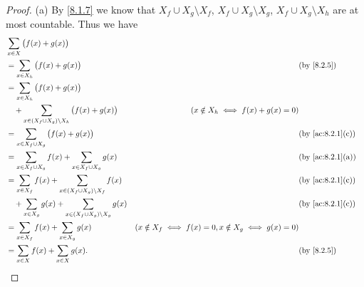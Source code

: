 \begin{proof}{(a)}
  By \cref{8.1.7} we know that \(X_f \cup X_g \setminus X_f\), \(X_f \cup X_g \setminus X_g\), \(X_f \cup X_g \setminus X_h\) are at most countable.
  Thus we have
  \begin{align*}
     & \sum_{x \in X} \big(f(x) + g(x)\big)                                                                                                                                       \\
     & = \sum_{x \in X_h} \big(f(x) + g(x)\big)                                       &                                                          & \text{(by \cref{8.2.5})}       \\
     & = \sum_{x \in X_h} \big(f(x) + g(x)\big)                                                                                                                                   \\
     & \quad + \sum_{x \in (X_f \cup X_g) \setminus X_h} \big(f(x) + g(x)\big)        & (x \notin X_h \iff f(x) + g(x) = 0)                                                       \\
     & = \sum_{x \in X_f \cup X_g} \big(f(x) + g(x)\big)                              &                                                          & \text{(by \cref{ac:8.2.1}(c))} \\
     & = \sum_{x \in X_f \cup X_g} f(x) + \sum_{x \in X_f \cup X_g} g(x)              &                                                          & \text{(by \cref{ac:8.2.1}(a))} \\
     & = \sum_{x \in X_f} f(x) + \sum_{x \in (X_f \cup X_g) \setminus X_f} f(x)       &                                                          & \text{(by \cref{ac:8.2.1}(c))} \\
     & \quad + \sum_{x \in X_g} g(x) + \sum_{x \in (X_f \cup X_g) \setminus X_g} g(x) &                                                          & \text{(by \cref{ac:8.2.1}(c))} \\
     & = \sum_{x \in X_f} f(x) + \sum_{x \in X_g} g(x)                                & (x \notin X_f \iff f(x) = 0, x \notin X_g \iff g(x) = 0)                                  \\
     & = \sum_{x \in X} f(x) + \sum_{x \in X} g(x).                                   &                                                          & \text{(by \cref{8.2.5})}
  \end{align*}
\end{proof}

